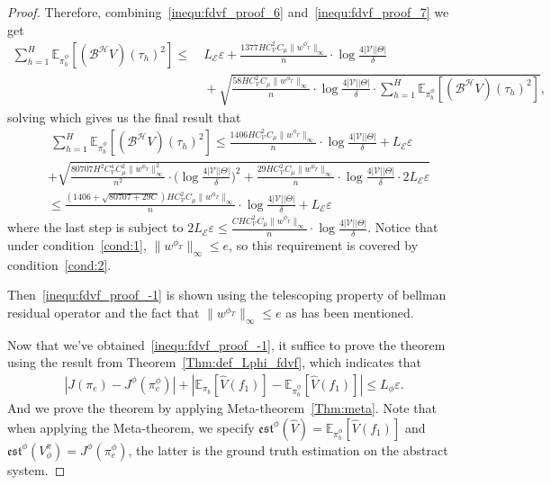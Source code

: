 \documentclass[twoside]{article}
\newcommand{\CAL}[1]{\mathcal{#1}}
\begin{document}
\begin{proof}
Therefore, combining~\eqref{inequ:fdvf_proof_6} and~\eqref{inequ:fdvf_proof_7} we get
\begin{align}
    \sum_{h=1}^H\mathbb{E}_{\pi_b^\phi}[(\CAL{B^H}V)(\tau_h)^2]\leq&\  L_\CAL{E}\varepsilon+\frac{1377HC_{\CAL{V}}^2C_\mu\|w^{\phi_T}\|_\infty}{n}\cdot\log\frac{4|\CAL{V}||\Theta|}{\delta}\nonumber\\
    &\ +\sqrt{\frac{58HC_{\CAL{V}}^2C_\mu\|w^{\phi_T}\|_\infty}{n}\cdot\log\frac{4|\CAL{V}||\Theta|}{\delta}\cdot \sum_{h=1}^H\mathbb{E}_{\pi_b^\phi}[(\CAL{B^H}V)(\tau_h)^2]},
\end{align}
solving which gives us the final result that
\begin{align}
    &\ \sum_{h=1}^H\mathbb{E}_{\pi_b^\phi}[(\CAL{B^H}V)(\tau_h)^2]\leq \frac{1406HC_{\CAL{V}}^2C_\mu\|w^{\phi_T}\|_\infty}{n}\cdot\log\frac{4|\CAL{V}||\Theta|}{\delta}+L_\CAL{E}\varepsilon\nonumber\\& + \sqrt{\frac{80707H^2C_{\CAL{V}}^4C_\mu^2\|w^{\phi_T}\|_\infty^2}{n^2}\cdot\bigg(\log\frac{4|\CAL{V}||\Theta|}{\delta}\bigg)^2+\frac{29HC_{\CAL{V}}^2C_\mu\|w^{\phi_T}\|_\infty}{n}\cdot\log\frac{4|\CAL{V}||\Theta|}{\delta}\cdot 2L_\CAL{E}\varepsilon}\\
    &\leq \frac{(1406+\sqrt{80707+29C})HC_{\CAL{V}}^2C_\mu\|w^{\phi_T}\|_\infty}{n}\cdot\log\frac{4|\CAL{V}||\Theta|}{\delta}+L_\CAL{E}\varepsilon
\end{align}
where the last step is subject to $2L_{\CAL{E}}\varepsilon\leq \frac{CHC_{\CAL{V}}^2C_\mu\|w^{\phi_T}\|_\infty}{n}\cdot\log\frac{4|\CAL{V}||\Theta|}{\delta}$. Notice that under condition~\ref{cond:1}, $\|w^{\phi_T}\|_\infty\leq e$, so this requirement is covered by condition~\ref{cond:2}.

Then~\eqref{inequ:fdvf_proof_-1} is shown using the telescoping property of bellman residual operator and the fact that $\|w^{\phi_T}\|_\infty\leq e$ as has been mentioned. 

Now that we've obtained~\eqref{inequ:fdvf_proof_-1}, it suffice to prove the theorem using the result from Theorem~\ref{Thm:def_Lphi_fdvf}, which indicates that
\begin{align}
    |J(\pi_e)-J^\phi(\pi_e^\phi)|+|\mathbb{E}_{\pi_b}[\hat{V}(f_1)]-\mathbb{E}_{\pi_b^\phi}[\hat{V}(f_1)]|\leq L_\phi\varepsilon.
\end{align}
And we prove the theorem by applying Meta-theorem~\ref{Thm:meta}. Note that when applying the Meta-theorem, we specify $\mathfrak{est}^\phi(\hat{V})=\mathbb{E}_{\pi_b^\phi}[\hat{V}(f_1)]$ and $\mathfrak{est}^\phi(V_\phi^\pi)=J^\phi(\pi_e^\phi)$, the latter is the ground truth estimation on the abstract system.
\end{proof}
\end{document}
